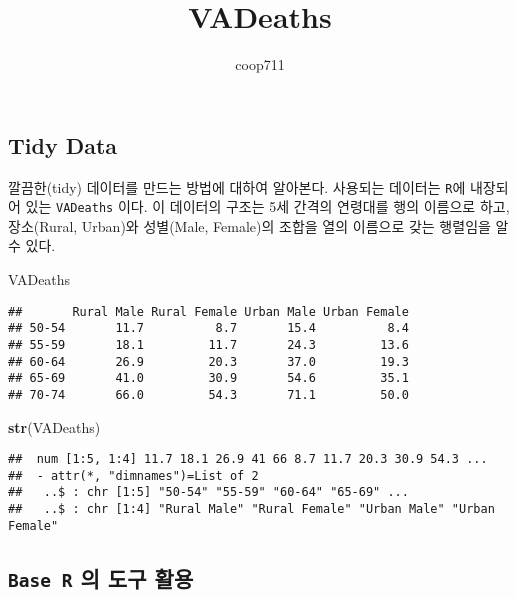 \documentclass[
]{article}
\title{VADeaths}
\author{coop711}
\date{}
\newenvironment{Shaded}{\begin{snugshade}}{\end{snugshade}}
\newcommand{\KeywordTok}[1]{\textcolor[rgb]{0.13,0.29,0.53}{\textbf{#1}}}
\newcommand{\NormalTok}[1]{#1}
\begin{document}
\maketitle

\hypertarget{tidy-data}{%
\subsection{Tidy Data}\label{tidy-data}}

깔끔한(tidy) 데이터를 만드는 방법에 대하여 알아본다. 사용되는 데이터는
\texttt{R}에 내장되어 있는 \texttt{VADeaths} 이다. 이 데이터의 구조는
5세 간격의 연령대를 행의 이름으로 하고, 장소(Rural, Urban)와 성별(Male,
Female)의 조합을 열의 이름으로 갖는 행렬임을 알 수 있다.

\begin{Shaded}
\begin{Highlighting}[]
\NormalTok{VADeaths}
\end{Highlighting}
\end{Shaded}

\begin{verbatim}
##       Rural Male Rural Female Urban Male Urban Female
## 50-54       11.7          8.7       15.4          8.4
## 55-59       18.1         11.7       24.3         13.6
## 60-64       26.9         20.3       37.0         19.3
## 65-69       41.0         30.9       54.6         35.1
## 70-74       66.0         54.3       71.1         50.0
\end{verbatim}

\begin{Shaded}
\begin{Highlighting}[]
\KeywordTok{str}\NormalTok{(VADeaths)}
\end{Highlighting}
\end{Shaded}

\begin{verbatim}
##  num [1:5, 1:4] 11.7 18.1 26.9 41 66 8.7 11.7 20.3 30.9 54.3 ...
##  - attr(*, "dimnames")=List of 2
##   ..$ : chr [1:5] "50-54" "55-59" "60-64" "65-69" ...
##   ..$ : chr [1:4] "Rural Male" "Rural Female" "Urban Male" "Urban Female"
\end{verbatim}

\hypertarget{base-r-uxc758-uxb3c4uxad6c-uxd65cuxc6a9}{%
\subsection{\texorpdfstring{\texttt{Base\ R} 의 도구
활용}{Base R 의 도구 활용}}\label{base-r-uxc758-uxb3c4uxad6c-uxd65cuxc6a9}}
\end{document}
